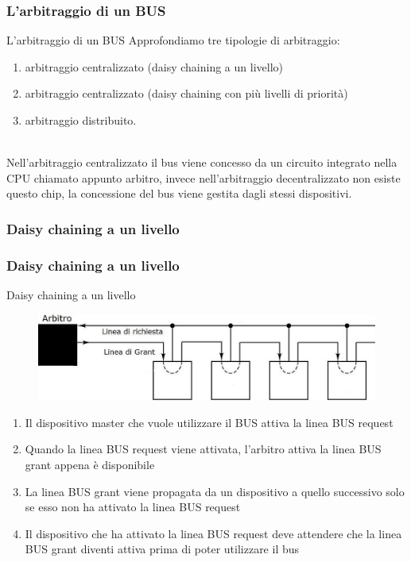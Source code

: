 \begin{frame}
	\frametitle{L'arbitraggio di un BUS}
	  
	\begin{block}{L'arbitraggio di un BUS}
		Approfondiamo tre tipologie di arbitraggio:
		\begin{enumerate}
			\item arbitraggio centralizzato (daisy chaining a un livello)
			\item arbitraggio centralizzato (daisy chaining con più livelli di priorità)
			\item arbitraggio distribuito.
		\end{enumerate}
		~\\
		Nell'arbitraggio centralizzato il bus viene concesso da un circuito integrato nella CPU chiamato appunto arbitro, invece nell'arbitraggio decentralizzato non esiste questo chip, la concessione del bus viene gestita dagli stessi dispositivi.

	\end{block}
\end{frame}



\subsubsection[Daisy chaining a un livello]{Daisy chaining a un livello}
\begin{frame}
	\frametitle{Daisy chaining a un livello}
	  
	\begin{block}{Daisy chaining a un livello}
		\begin{figure}[!htbp]
			\centering
			\includegraphics[width=0.8\linewidth]{images/6_bus/daisy_chaining_lev_1.jpg}
		\end{figure}
		\begin{footnotesize}
		\begin{enumerate}
			\item Il dispositivo master che vuole utilizzare il BUS attiva la linea BUS request
			\item Quando la linea BUS request viene attivata, l'arbitro attiva la linea BUS grant appena è disponibile
			\item La linea BUS grant viene propagata da un dispositivo a quello successivo solo se esso non ha attivato la linea BUS request
			\item Il dispositivo che ha attivato la linea BUS request deve attendere che la linea BUS grant diventi attiva prima di poter utilizzare il bus
		\end{enumerate}
		\end{footnotesize}
	\end{block}
\end{frame}


